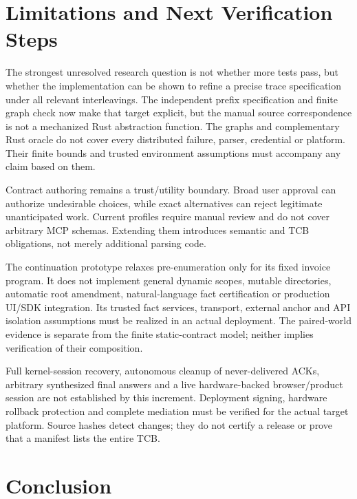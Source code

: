 \documentclass[letterpaper,twocolumn,10pt]{article}
\begin{document}
\section{Limitations and Next Verification Steps}
\label{sec:limits}

The strongest unresolved research question is not whether more tests pass,
but whether the implementation can be shown to refine a precise trace
specification under all relevant interleavings. The independent prefix
specification and finite graph check now make that target explicit, but the
manual source correspondence is not a mechanized Rust abstraction function.
The graphs and complementary Rust oracle do not cover every distributed
failure, parser, credential or platform. Their finite bounds and trusted
environment assumptions must accompany any claim based on them.

Contract authoring remains a trust/utility boundary. Broad user approval can
authorize undesirable choices, while exact alternatives can reject legitimate
unanticipated work. Current profiles require manual review and do not cover
arbitrary MCP schemas. Extending them introduces semantic and TCB obligations,
not merely additional parsing code.

The continuation prototype relaxes pre-enumeration only for its fixed invoice
program. It does not implement general dynamic scopes, mutable directories,
automatic root amendment, natural-language fact certification or production
UI/SDK integration. Its trusted fact services, transport, external anchor and
API isolation assumptions must be realized in an actual deployment. The
paired-world evidence is separate from the finite static-contract model;
neither implies verification of their composition.

Full kernel-session recovery, autonomous cleanup of never-delivered ACKs,
arbitrary synthesized final answers and a live hardware-backed browser/product
session are not established by this increment. Deployment signing, hardware
rollback protection and complete mediation must be verified for the actual
target platform. Source hashes detect changes; they do not certify a release
or prove that a manifest lists the entire TCB.

\section{Conclusion}
\end{document}
